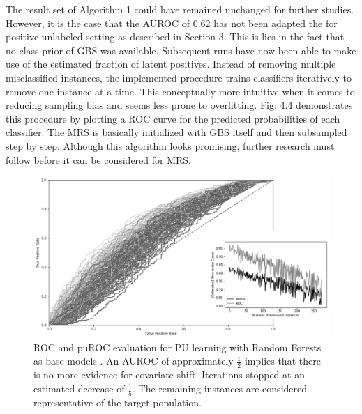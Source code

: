 The result set of Algorithm 1 could have remained unchanged for further studies. However, it is the case that the AUROC of 0.62 has not been adapted the for positive-unlabeled setting as described in Section 3. This is lies in the fact that no class prior of GBS was available. Subsequent runs have now been able to make use of the estimated fraction of latent positives. Instead of removing multiple misclassified instances, the implemented procedure trains classifiers iteratively to remove one instance at a time. This conceptually more intuitive when it comes to reducing sampling bias and seems less prone to overfitting. Fig. 4.4 demonstrates this procedure by plotting a ROC curve for the predicted probabilities of each classifier. The MRS is basically initialized with GBS itself and then subsampled step by step. Although this algorithm looks promising, further research must follow before it can be considered for MRS. 

\begin{figure}[ht]
\centering
   \includegraphics[scale=0.46,angle=0]{fig/res}
\captionsetup{width= 380pt}
\caption{ROC and puROC evaluation for PU learning with Random Forests as base models \cite{breiman2}. An AUROC of approximately \(\frac{1}{2}\) implies that there is no more evidence for covariate shift. Iterations stopped at an estimated decrease of \(\frac{1}{5}\). The remaining instances are considered representative of the target population.}
   \label{fig:Ng1} 
\end{figure}
